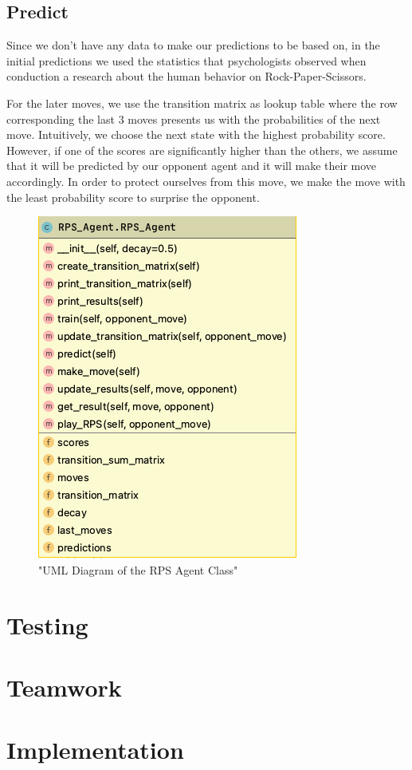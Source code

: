 \documentclass{IEEEtran}
\begin{document}
		
		
		 \label{update-matrix-code}

	\subsection{Predict}
		Since we don't have any data to make our predictions to be based on, in the initial predictions we used the statistics that psychologists observed when conduction a research about the human behavior on Rock-Paper-Scissors.  
		
		For the later moves, we use the transition matrix as lookup table where the row corresponding the last 3 moves presents us with the probabilities of the next move. Intuitively, we choose the next state with the highest probability score. However, if one of the scores are significantly higher than the others, we assume that it will be predicted by our opponent agent and it will make their move accordingly. In order to protect ourselves from this move, we make the move with the least probability score to surprise the opponent. 
			
				
		 \label{predict-code}
	
	\begin{figure}
		\centering
		\includegraphics[scale=0.5]{RPS_Agent.png}
		\caption{"UML Diagram of the RPS Agent Class"}
	\end{figure}\label{UML}
	
	
	\section{Testing}
		\lipsum
		
	\section{Teamwork}
			
			
	\section{Implementation}
	
	
	
\end{document}
